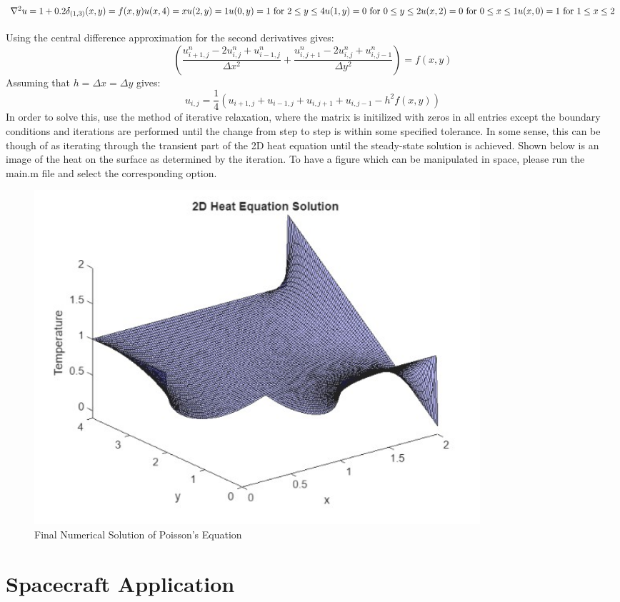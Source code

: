 \documentclass{article}
\begin{document}
\subsection*{$\nabla^2u = 1 + 0.2\delta_{(1,3)}(x,y) = f(x,y)\\u(x,4) = x\\u(2,y) = 1\\u(0,y) = 1 \text{ for } 2 \leq y \leq 4\\u(1,y) = 0 \text{ for } 0 \leq y \leq 2\\u(x,2) = 0 \text{ for } 0 \leq x \leq 1\\u(x,0) = 1 \text{ for } 1 \leq x \leq 2$}
Using the central difference approximation for the second derivatives gives:
\begin{equation}
    \left(\frac{u_{i+1,j}^n - 2u_{i,j}^n + u_{i-1,j}^n}{\Delta x^2} + \frac{u_{i,j+1}^n - 2u_{i,j}^n + u_{i,j-1}^n}{\Delta y^2}\right) = f(x,y)
\end{equation}
Assuming that $h=\Delta x=\Delta y$ gives:
\begin{equation}
    u_{i,j} = \frac{1}{4}\left(u_{i+1,j} + u_{i-1,j} + u_{i,j+1} + u_{i,j-1} - h^2f(x,y)\right)
\end{equation}
In order to solve this, use the method of iterative relaxation, where the matrix is initilized with zeros in all entries except the boundary conditions and iterations are performed until the change from step to step is within some specified tolerance. In some sense, this can be though of as iterating through the transient part of the 2D heat equation until the steady-state solution is achieved. Shown below is an image of the heat on the surface as determined by the iteration. To have a figure which can be manipulated in space, please run the main.m file and select the corresponding option.
\begin{figure}[H]
    \centering
    \includegraphics[width=0.8\textwidth]{poisson_example.jpg}
    \caption{Final Numerical Solution of Poisson's Equation}
\end{figure}

\section{Spacecraft Application}
\end{document}
